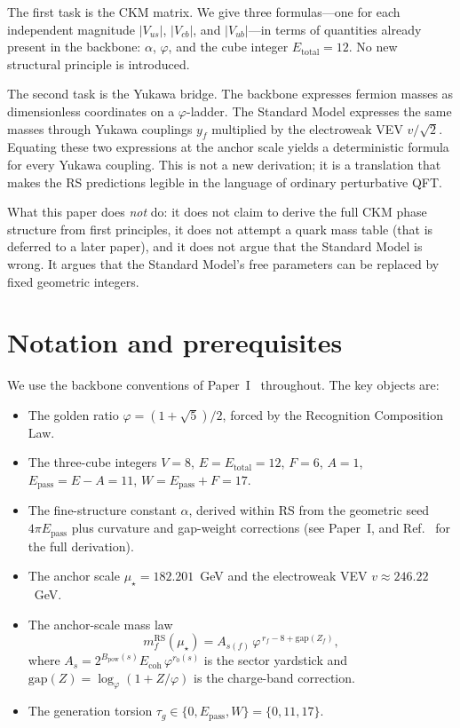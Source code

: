 \documentclass[11pt]{article}
\theoremstyle{remark}
\newcommand{\phig}{\varphi}
\newcommand{\mustar}{\mu_\star}
\newcommand{\Epass}{E_{\mathrm{pass}}}
\newcommand{\Ecoh}{E_{\mathrm{coh}}}
\newcommand{\Bpow}{B_{\mathrm{pow}}}
\newcommand{\Etot}{E_{\mathrm{total}}}
\begin{document}
The first task is the CKM matrix.  We give three formulas---one
for each independent magnitude $|V_{us}|$, $|V_{cb}|$, and
$|V_{ub}|$---in terms of quantities already present in the
backbone: $\alpha$, $\phig$, and the cube integer $\Etot=12$.
No new structural principle is introduced.

The second task is the Yukawa bridge.  The backbone expresses
fermion masses as dimensionless coordinates on a $\phig$-ladder.
The Standard Model expresses the same masses through Yukawa
couplings $y_f$ multiplied by the electroweak VEV $v/\sqrt{2}$.
Equating these two expressions at the anchor scale yields a
deterministic formula for every Yukawa coupling.  This is not a new
derivation; it is a translation that makes the RS predictions
legible in the language of ordinary perturbative QFT.

What this paper does \emph{not} do: it does not claim to derive
the full CKM phase structure from first principles, it does not
attempt a quark mass table (that is deferred to a later paper),
and it does not argue that the Standard Model is wrong.  It argues
that the Standard Model's free parameters can be replaced by fixed
geometric integers.

\section{Notation and prerequisites}

We use the backbone conventions of Paper~I~\cite{backbone}
throughout.  The key objects are:
\begin{itemize}
  \item The golden ratio $\phig=(1+\sqrt{5})/2$,
        forced by the Recognition Composition Law.
  \item The three-cube integers $V=8$, $E=\Etot=12$, $F=6$,
        $A=1$, $\Epass=E-A=11$, $W=\Epass+F=17$.
  \item The fine-structure constant $\alpha$, derived within RS
        from the geometric seed $4\pi\Epass$ plus curvature and
        gap-weight corrections (see Paper~I,
        and Ref.~\cite{fullderivation} for the full derivation).
  \item The anchor scale $\mustar=182.201$~GeV and the
        electroweak VEV $v\approx 246.22$~GeV.
  \item The anchor-scale mass law
        \begin{equation}\label{eq:masslaw}
          m_f^{\mathrm{RS}}(\mustar)
          = A_{s(f)}\,\phig^{\,r_f - 8 + \mathrm{gap}(Z_f)},
        \end{equation}
        where $A_s = 2^{\Bpow(s)}\Ecoh\,\phig^{r_0(s)}$
        is the sector yardstick and
        $\mathrm{gap}(Z)=\log_\phig(1+Z/\phig)$
        is the charge-band correction.
  \item The generation torsion $\tau_g\in\{0,\Epass,W\}=\{0,11,17\}$.
\end{itemize}
\end{document}

